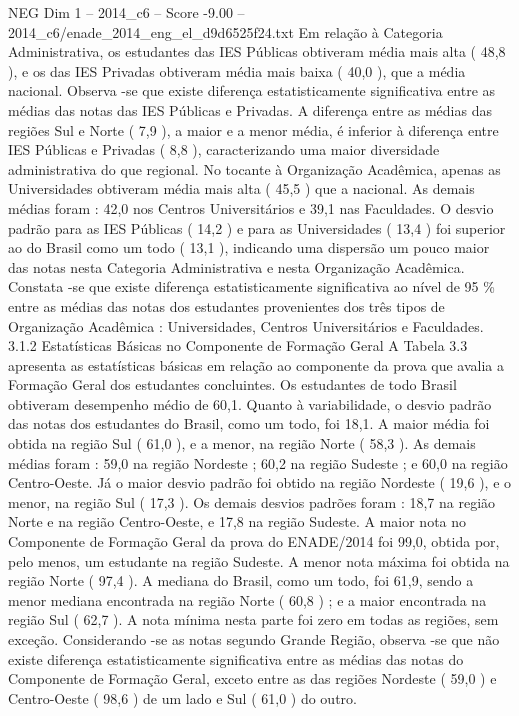 \begin{textsample}{NEG Dim 1 – 2014\_c6 – Score -9.00 – 2014\_c6/enade\_2014\_eng\_el\_d9d6525f24.txt}
Em relação à Categoria Administrativa, os estudantes das IES Públicas obtiveram média mais alta ( 48,8 ), e os das IES Privadas obtiveram média mais baixa ( 40,0 ), que a média nacional.
Observa -se que existe diferença estatisticamente significativa entre as médias das notas das IES Públicas e Privadas.
A diferença entre as médias das regiões Sul e Norte ( 7,9 ), a maior e a menor média, é inferior à diferença entre IES Públicas e Privadas ( 8,8 ), caracterizando uma maior diversidade administrativa do que regional.
No tocante à Organização Acadêmica, apenas as Universidades obtiveram média mais alta ( 45,5 ) que a nacional.
As demais médias foram : 42,0 nos Centros Universitários e 39,1 nas Faculdades.
O desvio padrão para as IES Públicas ( 14,2 ) e para as Universidades ( 13,4 ) foi superior ao do Brasil como um todo ( 13,1 ), indicando uma dispersão um pouco maior das notas nesta Categoria Administrativa e nesta Organização Acadêmica.
Constata -se que existe diferença estatisticamente significativa ao nível de 95 \% entre as médias das notas dos estudantes provenientes dos três tipos de Organização Acadêmica : Universidades, Centros Universitários e Faculdades. 3.1.2 Estatísticas Básicas no Componente de Formação Geral A Tabela 3.3 apresenta as estatísticas básicas em relação ao componente da prova que avalia a Formação Geral dos estudantes concluintes.
Os estudantes de todo Brasil obtiveram desempenho médio de 60,1.
Quanto à variabilidade, o desvio padrão das notas dos estudantes do Brasil, como um todo, foi 18,1.
A maior média foi obtida na região Sul ( 61,0 ), e a menor, na região Norte ( 58,3 ).
As demais médias foram : 59,0 na região Nordeste ; 60,2 na região Sudeste ; e 60,0 na região Centro-Oeste.
Já o maior desvio padrão foi obtido na região Nordeste ( 19,6 ), e o menor, na região Sul ( 17,3 ).
Os demais desvios padrões foram : 18,7 na região Norte e na região Centro-Oeste, e 17,8 na região Sudeste.
A maior nota no Componente de Formação Geral da prova do ENADE/2014 foi 99,0, obtida por, pelo menos, um estudante na região Sudeste.
A menor nota máxima foi obtida na região Norte ( 97,4 ).
A mediana do Brasil, como um todo, foi 61,9, sendo a menor mediana encontrada na região Norte ( 60,8 ) ; e a maior encontrada na região Sul ( 62,7 ).
A nota mínima nesta parte foi zero em todas as regiões, sem exceção.
Considerando -se as notas segundo Grande Região, observa -se que não existe diferença estatisticamente significativa entre as médias das notas do Componente de Formação Geral, exceto entre as das regiões Nordeste ( 59,0 ) e Centro-Oeste ( 98,6 ) de um lado e Sul ( 61,0 ) do outro.

\end{textsample}
